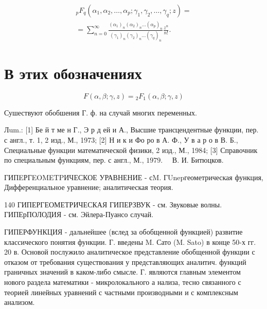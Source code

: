 \documentclass[10pt]{article}
\begin{document}
\[

\begin{gathered}

{ }_{p} F_{q}\left(\alpha_{1}, \alpha_{2}, \ldots, \alpha_{p} ; \gamma_{1}, \gamma_{2}, \ldots, \gamma_{q} ; z\right)= \\

=\sum_{n=0}^{\infty} \frac{\left(\alpha_{1}\right)_{n}\left(\alpha_{2}\right)_{n} \ldots\left(\alpha_{p}\right)_{n}}{\left(\gamma_{1}\right)_{n}\left(\gamma_{2}\right)_{n} \ldots\left(\gamma_{q}\right)_{n}} \frac{z^{n}}{n !} .

\end{gathered}

\]



\section{В этих обозначениях}

\[

F(\alpha, \beta ; \gamma, z)={ }_{2} F_{1}(\alpha, \beta ; \gamma, z)

\]



Сушествуют обобшения Г. ф. на случай многих переменных.



Лum.: [1] Бе й т ме н Г., Э р д ей и А., Высшие трансцендентные функции, пер. с англ., т. 1, 2 изд., М., 1973; [2] Н и к и Фо ро в А. Ф., У в а р о в В. Б., Специальные функции математической физики, 2 изд., М., 1984; [3] Справочник по специальным функциям, пер. с англ., М., $1979 . \quad$ В. И. Битюцков.



ГИПEРГEOMETPИЧЕСКОЕ УРАВНЕНИЕ - сM. ГUnepгеометрическая функция, Дифференциальное уравнение; аналитическая теория.



140 ГИПЕРГЕОМЕТРИЧЕСКАЯ ГИПЕРЗВУК - см. Звуковые волны. ГИПЕрПОЛОДИЯ - см. Эйлера-Пуансо случай.



ГИПЕРФУНКЦИЯ - дальнейшее (вслед за обобщенной функцией) развитие классического понятия функции. Г. введены M. Сато (M. Sato) в конце 50-х гг. 20 в. Основой послужило аналитическое представление обобщенной функции с отказом от требования существования у представляющих аналитич. функций граничных значений в каком-либо смысле. Г. являются главным элементом нового раздела математики - микролокального а нализа, тесно связанного с теорией линейных уравнений с частными производными и с комплексным анализом.
\end{document}

